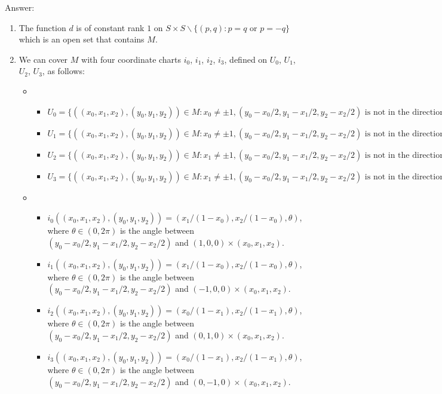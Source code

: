 \documentclass{article}
\theoremstyle{definition}
\begin{document}
Answer:
\begin{enumerate}
    \item The function $d$ is of constant rank $1$ on $S\times S\backslash \{(p, q): p=q\text{ or }p=-q\}$ which is an open set that contains $M$.
    \item We can cover $M$ with four coordinate charts $i_0$, $i_1$, $i_2$, $i_3$, defined on $U_0$, $U_1$, $U_2$, $U_3$, as follows:
    \begin{itemize}
        \item \begin{itemize}
            \item $U_0=\{((x_0, x_1, x_2), (y_0, y_1, y_2))\in M: x_0\not=\pm 1, (y_0-x_0/2, y_1-x_1/2, y_2-x_2/2)\text{ is not in the direction of}(1, 0, 0)\times (x_0, x_1, x_2)\}$
            \item $U_1=\{((x_0, x_1, x_2), (y_0, y_1, y_2))\in M: x_0\not=\pm 1, (y_0-x_0/2, y_1-x_1/2, y_2-x_2/2)\text{ is not in the direction of}(-1, 0, 0)\times (x_0, x_1, x_2)\}$
            \item $U_2=\{((x_0, x_1, x_2), (y_0, y_1, y_2))\in M: x_1\not=\pm 1, (y_0-x_0/2, y_1-x_1/2, y_2-x_2/2)\text{ is not in the direction of}(0, 1, 0)\times (x_0, x_1, x_2)\}$
            \item $U_3=\{((x_0, x_1, x_2), (y_0, y_1, y_2))\in M: x_1\not=\pm 1, (y_0-x_0/2, y_1-x_1/2, y_2-x_2/2)\text{ is not in the direction of}(0, -1, 0)\times (x_0, x_1, x_2)\}$
        \end{itemize}
        \item \begin{itemize}
        \item $i_0((x_0, x_1, x_2), (y_0, y_1, y_2))=(x_1/(1-x_0), x_2/(1-x_0), \theta)$, where $\theta\in (0, 2\pi)$ is the angle between $(y_0-x_0/2, y_1-x_1/2, y_2-x_2/2)$ and $(1, 0, 0)\times (x_0, x_1, x_2)$.
        \item $i_1((x_0, x_1, x_2), (y_0, y_1, y_2))=(x_1/(1-x_0), x_2/(1-x_0), \theta)$, where $\theta\in (0, 2\pi)$ is the angle between $(y_0-x_0/2, y_1-x_1/2, y_2-x_2/2)$ and $(-1, 0, 0)\times (x_0, x_1, x_2)$.
        \item $i_2((x_0, x_1, x_2), (y_0, y_1, y_2))=(x_0/(1-x_1), x_2/(1-x_1), \theta)$, where $\theta\in (0, 2\pi)$ is the angle between $(y_0-x_0/2, y_1-x_1/2, y_2-x_2/2)$ and $(0, 1, 0)\times (x_0, x_1, x_2)$.
        \item $i_3((x_0, x_1, x_2), (y_0, y_1, y_2))=(x_0/(1-x_1), x_2/(1-x_1), \theta)$, where $\theta\in (0, 2\pi)$ is the angle between $(y_0-x_0/2, y_1-x_1/2, y_2-x_2/2)$ and $(0, -1, 0)\times (x_0, x_1, x_2)$. 
        \end{itemize}
    \end{itemize}
\end{enumerate}
\end{document}
